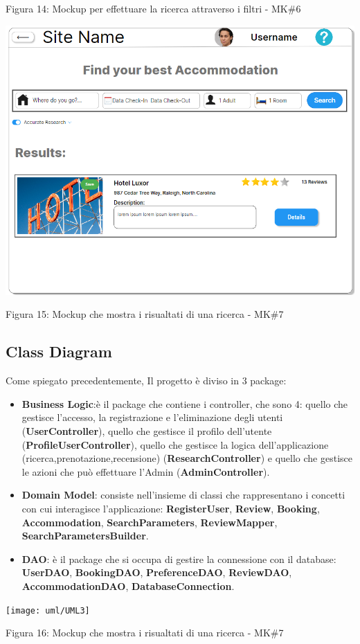 \documentclass[10pt]{article}
\begin{document}
\begin{center}
\par\medskip
Figura 14: Mockup per effettuare la ricerca attraverso i filtri - MK\#6
\par\medskip
\includegraphics[scale=0.6]{Mockup/MockupResult}
\par\medskip
Figura 15: Mockup che mostra i risualtati di una ricerca - MK\#7
\par\medskip
\end{center}

\subsection{Class Diagram}
Come spiegato precedentemente, Il progetto è diviso in 3 package:
\begin{itemize}
\item \textbf{Business Logic}:è il package che contiene i controller, che sono 4: quello che gestisce l'accesso, la registrazione e l'eliminazione degli utenti (\textbf{UserController}), quello che gestisce il profilo dell'utente (\textbf{ProfileUserController}), quello che gestisce la logica dell'applicazione (ricerca,prenotazione,recensione) (\textbf{ResearchController}) e quello che gestisce le azioni che può effettuare l'Admin (\textbf{AdminController}). 
\item \textbf{Domain Model}: consiste nell’insieme di classi che rappresentano i concetti con cui interagisce l’applicazione: \textbf{RegisterUser}, \textbf{Review}, \textbf{Booking}, \textbf{Accommodation}, \textbf{SearchParameters}, \textbf{ReviewMapper}, \textbf{SearchParametersBuilder}.
\item \textbf{DAO}: è il package che si occupa di gestire la connessione con il database: \textbf{UserDAO}, \textbf{BookingDAO}, \textbf{PreferenceDAO}, \textbf{ReviewDAO}, \textbf{AccommodationDAO}, \textbf{DatabaseConnection}.
\end{itemize}
\begin{center}
\texttt{[image: uml/UML3]}
\par\medskip
Figura 16: Mockup che mostra i risualtati di una ricerca - MK\#7
\par\medskip
\end{center}
\end{document}
